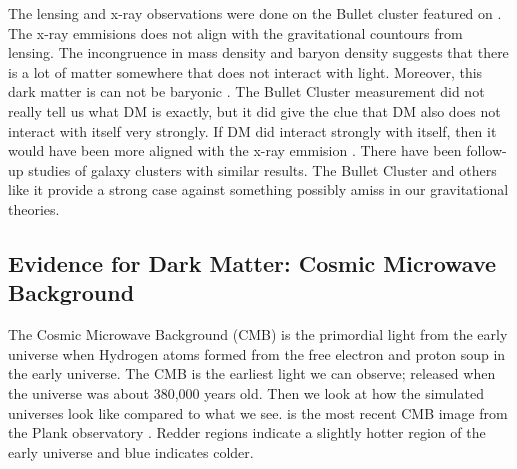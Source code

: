 The lensing and x-ray observations were done on the Bullet cluster featured on .
The x-ray emmisions does not align with the gravitational countours from lensing.
The incongruence in mass density and baryon density suggests that there is a lot of matter somewhere that does not interact with light.
Moreover, this dark matter is can not be baryonic \cite{Clowe:BulletCluster}.
The Bullet Cluster measurement did not really tell us what DM is exactly, but it did give the clue that DM also does not interact with itself very strongly.
If DM did interact strongly with itself, then it would have been more aligned with the x-ray emmision \cite{Clowe:BulletCluster}.
There have been follow-up studies of galaxy clusters with similar results.
The Bullet Cluster and others like it provide a strong case against something possibly amiss in our gravitational theories.

\subsection{Evidence for Dark Matter: Cosmic Microwave Background\label{sec:ev4dm_cmb}}


\begin{figure}[ht]
\end{figure}

The Cosmic Microwave Background (CMB) is the primordial light from the early universe when Hydrogen atoms formed from the free electron and proton soup in the early universe.
The CMB is the earliest light we can observe; released when the universe was about 380,000 years old.
Then we look at how the simulated universes look like compared to what we see.
 is the most recent CMB image from the Plank observatory \cite{Plank:CMB}.
Redder regions indicate a slightly hotter region of the early universe and blue indicates colder.

